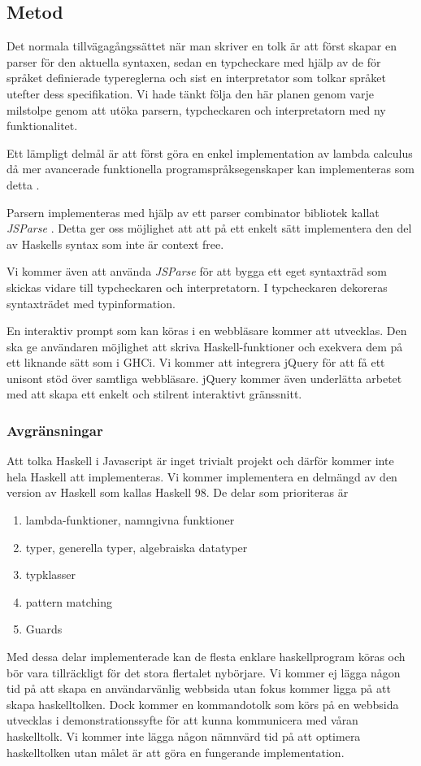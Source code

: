 \subsection{Metod}
Det normala tillvägagångssättet när man skriver en tolk är att först
skapar en parser för den aktuella syntaxen, sedan en typcheckare med 
hjälp av de för språket definierade typereglerna och sist en interpretator
som tolkar språket utefter dess specifikation. Vi hade tänkt följa den här planen genom varje milstolpe genom att utöka parsern, typcheckaren och interpretatorn med ny funktionalitet.

Ett lämpligt delmål är att först göra en enkel implementation av lambda calculus då mer avancerade funktionella programspråksegenskaper kan implementeras som detta \citep{jones87}.

 Parsern implementeras med hjälp av ett parser combinator bibliotek kallat \emph{JSParse} \citep{jsparse}. Detta ger oss möjlighet att att på ett enkelt sätt implementera den del av Haskells syntax som inte är context free.

Vi kommer även att använda \emph{JSParse} för att bygga ett eget syntaxträd som skickas vidare till typcheckaren och interpretatorn. I typcheckaren dekoreras syntaxträdet med typinformation.

En interaktiv prompt som kan köras i en webbläsare kommer att utvecklas. Den ska ge användaren möjlighet att skriva Haskell-funktioner och exekvera dem på ett liknande sätt som i GHCi. 
Vi kommer att integrera jQuery \citep{jquery} för att få ett unisont stöd över samtliga webbläsare. jQuery kommer även underlätta arbetet med att skapa ett enkelt och stilrent interaktivt gränssnitt.

\subsubsection{Avgränsningar} 
Att tolka Haskell i Javascript är inget trivialt projekt och därför kommer inte hela Haskell att implementeras. Vi kommer implementera en delmängd av den version av Haskell som kallas Haskell 98.
De delar som prioriteras är
        \begin{enumerate}
            \item{lambda-funktioner, namngivna funktioner}
            \item{typer, generella typer, algebraiska datatyper}
            \item{typklasser}
            \item{pattern matching}
            \item{Guards}
        \end{enumerate}
Med dessa delar implementerade kan de flesta enklare haskellprogram köras och bör vara tillräckligt för det stora flertalet nybörjare. Vi kommer ej lägga någon tid på att skapa en användarvänlig webbsida utan fokus kommer ligga på att skapa haskelltolken. Dock kommer en kommandotolk som körs på en webbsida utvecklas i demonstrationssyfte för att kunna kommunicera med våran haskelltolk. 
Vi kommer inte lägga någon nämnvärd tid på att optimera haskelltolken utan målet är att göra en fungerande implementation. 

